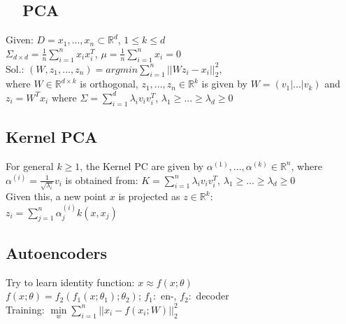 \subsection*{ ~~PCA}

Given: $D={x_1,...,x_n} \subset \mathbb{R}^d$, $1\leq k \leq d$\\
$\Sigma_{d \times d} = \frac{1}{n}\sum_{i=1}^n x_i x_i^T$, $\mu =\frac{1}{n}\sum_{i = 1}^n x_i = 0$\\
Sol.:
$(W,z_1,...,z_n) = argmin \sum_{i=1}^n||W z_i - x_i||_2^2$,\\
where $W \in \mathbb{R}^{d \times k}$ is orthogonal, $z_1,...,z_n\in\mathbb{R}^k$ is given by $W = (v_1|...|v_k)$ and $z_i = W^T x_i$ where $\Sigma = \sum_{i=1}^d \lambda_i v_i v_i^T$, $\lambda_1 \geq ... \geq \lambda_d \geq 0$

\subsection*{Kernel PCA}
For general $k\geq1$, the Kernel PC are given by $\alpha^{(1)},...,\alpha^{(k)}\in \mathbb{R}^n$, where $\alpha^{(i)} = \frac{1}{\sqrt{\lambda_i}}v_i$ is obtained from: $K = \sum_{i=1}^n \lambda_i v_i v_i^T$, $\lambda_1 \geq ... \geq \lambda_d \geq 0$\\
Given this, a new point $x$ is projected as $z \in \mathbb{R}^k$:\\
$z_i = \sum_{j=1}^n\alpha_j^{(i)}k(x,x_j)$

\subsection*{Autoencoders}
Try to learn identity function: $x \approx f(x;\theta)$\\
$f(x;\theta) = f_2(f_1(x;\theta_1);\theta_2)$; $f_1:$ en-, $f_2:$ decoder\\
Training: $ \underset{w}{\operatorname{min}}\sum_{i=1}^n||x_i-f(x_i;W)||_2^2$